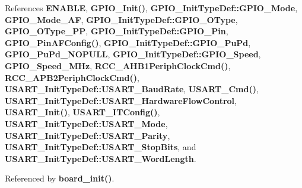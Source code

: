 References \textbf{ E\+N\+A\+B\+LE}, \textbf{ G\+P\+I\+O\+\_\+\+Init()}, \textbf{ G\+P\+I\+O\+\_\+\+Init\+Type\+Def\+::\+G\+P\+I\+O\+\_\+\+Mode}, \textbf{ G\+P\+I\+O\+\_\+\+Mode\+\_\+\+AF}, \textbf{ G\+P\+I\+O\+\_\+\+Init\+Type\+Def\+::\+G\+P\+I\+O\+\_\+\+O\+Type}, \textbf{ G\+P\+I\+O\+\_\+\+O\+Type\+\_\+\+PP}, \textbf{ G\+P\+I\+O\+\_\+\+Init\+Type\+Def\+::\+G\+P\+I\+O\+\_\+\+Pin}, \textbf{ G\+P\+I\+O\+\_\+\+Pin\+A\+F\+Config()}, \textbf{ G\+P\+I\+O\+\_\+\+Init\+Type\+Def\+::\+G\+P\+I\+O\+\_\+\+Pu\+Pd}, \textbf{ G\+P\+I\+O\+\_\+\+Pu\+Pd\+\_\+\+N\+O\+P\+U\+LL}, \textbf{ G\+P\+I\+O\+\_\+\+Init\+Type\+Def\+::\+G\+P\+I\+O\+\_\+\+Speed}, \textbf{ G\+P\+I\+O\+\_\+\+Speed\+\_\+M\+Hz}, \textbf{ R\+C\+C\+\_\+\+A\+H\+B1\+Periph\+Clock\+Cmd()}, \textbf{ R\+C\+C\+\_\+\+A\+P\+B2\+Periph\+Clock\+Cmd()}, \textbf{ U\+S\+A\+R\+T\+\_\+\+Init\+Type\+Def\+::\+U\+S\+A\+R\+T\+\_\+\+Baud\+Rate}, \textbf{ U\+S\+A\+R\+T\+\_\+\+Cmd()}, \textbf{ U\+S\+A\+R\+T\+\_\+\+Init\+Type\+Def\+::\+U\+S\+A\+R\+T\+\_\+\+Hardware\+Flow\+Control}, \textbf{ U\+S\+A\+R\+T\+\_\+\+Init()}, \textbf{ U\+S\+A\+R\+T\+\_\+\+I\+T\+Config()}, \textbf{ U\+S\+A\+R\+T\+\_\+\+Init\+Type\+Def\+::\+U\+S\+A\+R\+T\+\_\+\+Mode}, \textbf{ U\+S\+A\+R\+T\+\_\+\+Init\+Type\+Def\+::\+U\+S\+A\+R\+T\+\_\+\+Parity}, \textbf{ U\+S\+A\+R\+T\+\_\+\+Init\+Type\+Def\+::\+U\+S\+A\+R\+T\+\_\+\+Stop\+Bits}, and \textbf{ U\+S\+A\+R\+T\+\_\+\+Init\+Type\+Def\+::\+U\+S\+A\+R\+T\+\_\+\+Word\+Length}.



Referenced by \textbf{ board\+\_\+init()}.



